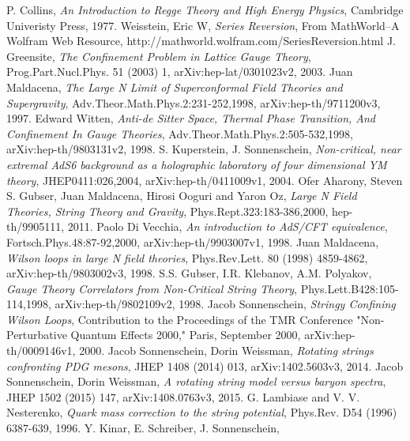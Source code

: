 \documentclass[11pt,a4paper]{article}
\begin{document}
\begin{thebibliography}{9}
	P. Collins,
	\emph{An Introduction to Regge Theory and High Energy Physics},
	Cambridge Univeristy
Press,
	1977.
	Weisstein, Eric W,
	\emph{Series Reversion},
	From MathWorld--A Wolfram Web Resource,
	http://mathworld.wolfram.com/SeriesReversion.html
	J. Greensite,
	\emph{The Confinement Problem in Lattice Gauge Theory},
	Prog.Part.Nucl.Phys. 51 (2003) 1,
	arXiv:hep-lat/0301023v2,
	2003.
	Juan Maldacena,
	\emph{The Large N Limit of Superconformal Field Theories and Supergravity},
	Adv.Theor.Math.Phys.2:231-252,1998,
	arXiv:hep-th/9711200v3,
	1997.
	Edward Witten,
	\emph{Anti-de Sitter Space, Thermal Phase Transition, And Confinement In Gauge Theories},
	Adv.Theor.Math.Phys.2:505-532,1998,
	arXiv:hep-th/9803131v2,
	1998.
	S. Kuperstein, J. Sonnenschein,
	\emph{Non-critical, near extremal AdS6 background as a holographic laboratory of four dimensional YM theory},
	JHEP0411:026,2004,
	arXiv:hep-th/0411009v1,
	2004.
	Ofer Aharony, Steven S. Gubser, Juan Maldacena, Hirosi Ooguri and Yaron Oz,
	\emph{Large N Field Theories, String Theory and Gravity},
	Phys.Rept.323:183-386,2000,
	hep-th/9905111,
	2011.
	Paolo Di Vecchia,
	\emph{An introduction to AdS/CFT equivalence},
	Fortsch.Phys.48:87-92,2000,
	arXiv:hep-th/9903007v1,
	1998.
	Juan Maldacena,
	\emph{Wilson loops in large N field theories},
	Phys.Rev.Lett. 80 (1998) 4859-4862,
	arXiv:hep-th/9803002v3,
	1998.
	S.S. Gubser, I.R. Klebanov, A.M. Polyakov,
	\emph{Gauge Theory Correlators from Non-Critical String Theory},
	Phys.Lett.B428:105-114,1998,
	arXiv:hep-th/9802109v2,
	1998.
	Jacob Sonnenschein,
	\emph{Stringy Confining Wilson Loops},
	Contribution to the Proceedings of the TMR Conference "Non-Perturbative Quantum Effects 2000," Paris, September 2000,
	arXiv:hep-th/0009146v1,
	2000.
	Jacob Sonnenschein, Dorin Weissman,
	\emph{Rotating strings confronting PDG mesons},
	JHEP 1408 (2014) 013,
	arXiv:1402.5603v3,
	2014.
	Jacob Sonnenschein, Dorin Weissman,
	\emph{A rotating string model versus baryon spectra},
	JHEP 1502 (2015) 147,
	arXiv:1408.0763v3,
	2015.
	G. Lambiase and V. V. Nesterenko,
	\emph{Quark mass correction to the string potential},
	Phys.Rev. D54 (1996) 6387-639,
	1996.
	Y. Kinar, E. Schreiber, J. Sonnenschein,

\end{thebibliography}
\end{document}
